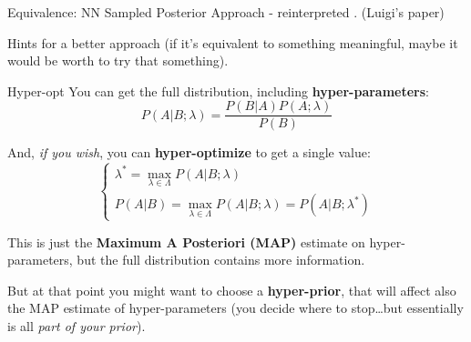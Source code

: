 \documentclass[9pt]{beamer}
\begin{document}
\begin{frame}{Equivalence: NN Sampled Posterior}
    \nnpdf{} Approach - reinterpreted
    . (Luigi's paper)

    Hints for a better approach (if it's equivalent to something meaningful,
    maybe it would be worth to try that something).
\end{frame}

\begin{frame}{Hyper-opt}
    You can get the full distribution, including \textbf{hyper-parameters}:
    \begin{equation*}
        P(A|B;\lambda) = \frac{P(B|A) P(A;\lambda)}{P(B)}
    \end{equation*}

    And, \textit{if you wish}, you can \alert{\textbf{hyper-optimize}} to get a
    single value:
    \begin{equation*}
        \begin{cases}
            \lambda^* = \max_{\lambda \in \Lambda} P(A|B;\lambda)\\
            P(A|B) = \max_{\lambda \in \Lambda} P(A|B;\lambda) = P(A|B; \lambda^*)
        \end{cases}
    \end{equation*}
    
    This is just the \textbf{Maximum A Posteriori (MAP)} estimate on
    hyper-parameters, but the full distribution contains more information.

    But at that point you might want to choose a \textbf{hyper-prior}, that
    will affect also the MAP estimate of hyper-parameters (you decide where to
    stop\dots but essentially is all \textit{part of your prior}).
\end{frame}
\end{document}
